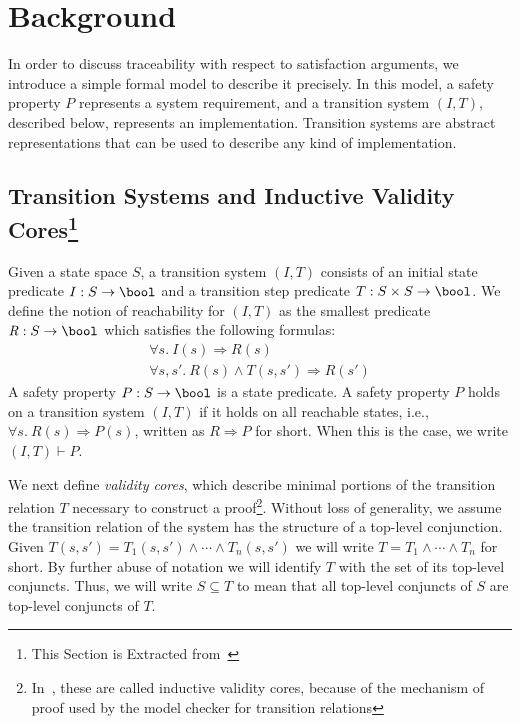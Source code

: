 \section{Background}
\label{sec:background}

\newcommand{\reach}{\mathit{R}}
\newcommand{\ite}[3]{\mathit{if}\ {#1}\ \mathit{then}\ {#2}\ \mathit{else}\ {#3}}

In order to discuss traceability with respect to satisfaction arguments, we introduce a simple formal model to describe it precisely.  In this model, a safety property $P$ represents a system requirement, and a transition system $(I, T)$, described below, represents an implementation.  Transition systems are abstract representations that can be used to describe any kind of implementation.


\subsection{Transition Systems and Inductive Validity Cores\footnote{This Section is Extracted  from~\cite{IVCTechReport} } }

Given a state space $S$, a transition system $(I,T)$ consists of an
initial state predicate $I : S \to \bool$ and a transition step
predicate $T : S \times S \to \bool$. We define the notion of
reachability for $(I, T)$ as the smallest predicate $\reach : S \to
\bool$ which satisfies the following formulas:
\begin{gather*}
  \forall s.~ I(s) \Rightarrow \reach(s) \\
  \forall s, s'.~ \reach(s) \land T(s, s') \Rightarrow \reach(s')
\end{gather*}
A safety property $P : S \to \bool$ is a state predicate. A safety
property $P$ holds on a transition system $(I, T)$ if it holds on all
reachable states, i.e., $\forall s.~ \reach(s) \Rightarrow P(s)$,
written as $\reach \Rightarrow P$ for short. When this is the case, we
write $(I, T)\vdash P$.

We next define {\em validity cores}, which describe minimal portions of the transition relation $T$ necessary to construct a proof\footnote{In~\cite{IVCTechReport}, these are called inductive validity cores, because of the mechanism of proof used by the model checker for transition relations}.  Without loss of generality, we assume the
transition relation of the system has the structure of a top-level
conjunction. Given $T(s, s') = T_1(s, s')
\land \cdots \land T_n(s, s')$ we will write $T = T_1 \land \cdots
\land T_n$ for short. By further abuse of notation we will identify
$T$ with the set of its top-level conjuncts. %
Thus, we will write $S
\subseteq T$ to mean that all top-level conjuncts of $S$ are top-level
conjuncts of $T$. %

